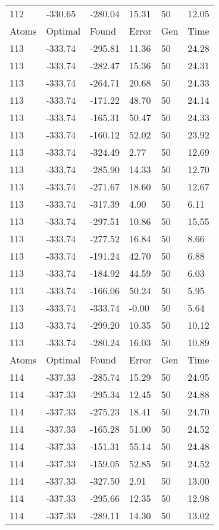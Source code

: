 \documentclass{report}
\begin{document}
\begin{appendix}
\begin{longtable}{llllll}
112 & -330.65 & -280.04 & 15.31 & 50 & 12.05 \\
Atoms & Optimal & Found & Error & Gen & Time \\
113 & -333.74 & -295.81 & 11.36 & 50 & 24.28 \\
113 & -333.74 & -282.47 & 15.36 & 50 & 24.31 \\
113 & -333.74 & -264.71 & 20.68 & 50 & 24.33 \\
113 & -333.74 & -171.22 & 48.70 & 50 & 24.14 \\
113 & -333.74 & -165.31 & 50.47 & 50 & 24.33 \\
113 & -333.74 & -160.12 & 52.02 & 50 & 23.92 \\
113 & -333.74 & -324.49 & 2.77 & 50 & 12.69 \\
113 & -333.74 & -285.90 & 14.33 & 50 & 12.70 \\
113 & -333.74 & -271.67 & 18.60 & 50 & 12.67 \\
113 & -333.74 & -317.39 & 4.90 & 50 & 6.11 \\
113 & -333.74 & -297.51 & 10.86 & 50 & 15.55 \\
113 & -333.74 & -277.52 & 16.84 & 50 & 8.66 \\
113 & -333.74 & -191.24 & 42.70 & 50 & 6.88 \\
113 & -333.74 & -184.92 & 44.59 & 50 & 6.03 \\
113 & -333.74 & -166.06 & 50.24 & 50 & 5.95 \\
113 & -333.74 & -333.74 & -0.00 & 50 & 5.64 \\
113 & -333.74 & -299.20 & 10.35 & 50 & 10.12 \\
113 & -333.74 & -280.24 & 16.03 & 50 & 10.89 \\
Atoms & Optimal & Found & Error & Gen & Time \\
114 & -337.33 & -285.74 & 15.29 & 50 & 24.95 \\
114 & -337.33 & -295.34 & 12.45 & 50 & 24.88 \\
114 & -337.33 & -275.23 & 18.41 & 50 & 24.70 \\
114 & -337.33 & -165.28 & 51.00 & 50 & 24.52 \\
114 & -337.33 & -151.31 & 55.14 & 50 & 24.48 \\
114 & -337.33 & -159.05 & 52.85 & 50 & 24.52 \\
114 & -337.33 & -327.50 & 2.91 & 50 & 13.00 \\
114 & -337.33 & -295.66 & 12.35 & 50 & 12.98 \\
114 & -337.33 & -289.11 & 14.30 & 50 & 13.02 \\

\end{longtable}
\end{appendix}
\end{document}
